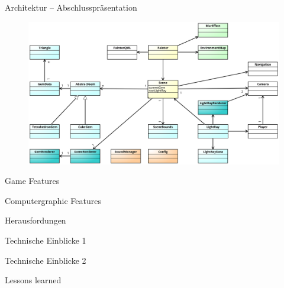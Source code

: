 \begin{frame}{Architektur -- Abschlusspräsentation}
	\begin{figure}
		\centering
		\includegraphics[width=\textwidth, height=\textheight, keepaspectratio]{images/klassendiagramm-final}
	\end{figure}
\end{frame}

\begin{frame}{Game Features}

\end{frame}

\begin{frame}{Computergraphic Features}

\end{frame}

\begin{frame}{Herausfordungen}

\end{frame}

\begin{frame}{Technische Einblicke 1}

\end{frame}

\begin{frame}{Technische Einblicke 2}

\end{frame}

\begin{frame}{Lessons learned}

\end{frame}

%

